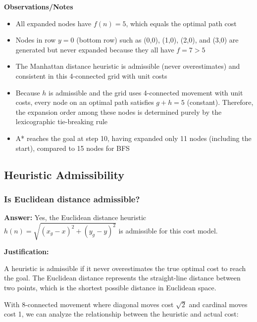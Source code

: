 \documentclass[11pt]{article}
\begin{document}
\textbf{Observations/Notes}

\begin{itemize}
    \item All expanded nodes have $f(n) = 5$, which equals the optimal path cost
    \item Nodes in row $y=0$ (bottom row) such as (0,0), (1,0), (2,0), and (3,0) are generated but never expanded because they all have $f = 7 > 5$
    \item The Manhattan distance heuristic is admissible (never overestimates) and consistent in this 4-connected grid with unit costs
    \item Because $h$ is admissible and the grid uses 4-connected movement with unit costs, every node on an optimal path satisfies $g + h = 5$ (constant). Therefore, the expansion order among these nodes is determined purely by the lexicographic tie-breaking rule
    \item A* reaches the goal at step 10, having expanded only 11 nodes (including the start), compared to 15 nodes for BFS
\end{itemize}

\subsection{Heuristic Admissibility}

\subsubsection*{Is Euclidean distance admissible?}

\textbf{Answer:} Yes, the Euclidean distance heuristic $h(n) = \sqrt{(x_g - x)^2 + (y_g - y)^2}$ is admissible for this cost model.

\textbf{Justification:}

A heuristic is admissible if it never overestimates the true optimal cost to reach the goal. The Euclidean distance represents the straight-line distance between two points, which is the shortest possible distance in Euclidean space.

With 8-connected movement where diagonal moves cost $\sqrt{2}$ and cardinal moves cost 1, we can analyze the relationship between the heuristic and actual cost:
\end{document}
